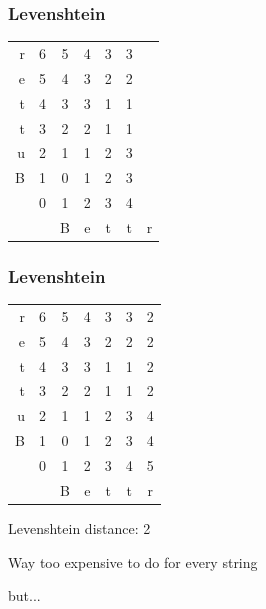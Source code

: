 \documentclass[10pt]{beamer}
\begin{document}
\begin{frame}[fragile]
  \frametitle{Levenshtein}

  \centering
\begin{tabular}{ r || c c c c c c  }
  r & 6 & 5 & 4 & 3 & 3 &  \\
  e & 5 & 4 & 3 & 2 & 2 &  \\
  t & 4 & 3 & 3 & 1 & 1 &  \\
  t & 3 & 2 & 2 & 1 & 1 &  \\
  u & 2 & 1 & 1 & 2 & 3 &  \\
  B & 1 & 0 & 1 & 2 & 3 &  \\
    & 0 & 1 & 2 & 3 & 4 &  \\
  \hline
    &   & B & e & t & t & r \\
\end{tabular}

  
\end{frame}



\begin{frame}[fragile]
  \frametitle{Levenshtein}

  \centering
\begin{tabular}{ r || c c c c c c  }
  r & 6 & 5 & 4 & 3 & 3 & 2 \\
  e & 5 & 4 & 3 & 2 & 2 & 2 \\
  t & 4 & 3 & 3 & 1 & 1 & 2 \\
  t & 3 & 2 & 2 & 1 & 1 & 2 \\
  u & 2 & 1 & 1 & 2 & 3 & 4 \\
  B & 1 & 0 & 1 & 2 & 3 & 4 \\
    & 0 & 1 & 2 & 3 & 4 & 5 \\
  \hline
    &   & B & e & t & t & r \\
\end{tabular}

  Levenshtein distance: 2
  \pause

  Way too expensive to do for every string
  \pause

   but...
\end{frame}
\end{document}
